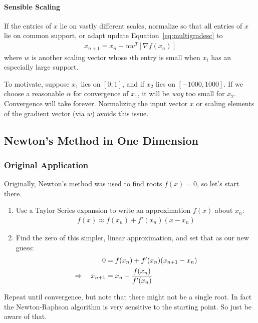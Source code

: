 \documentclass[a4paper,12pt]{scrartcl}
\theoremstyle{definition}
\theoremstyle{remark}
\begin{document}
\paragraph{Sensible Scaling}
If the entries of $x$ lie on vastly different scales, normalize so that
all entries of $x$ lie on common support, or adapt update
Equation~\ref{eq:multigradesc} to
\begin{align}
  x_{n+1} = x_n - \alpha w^T [\nabla f(x_n)]
\end{align}
where $w$ is another scaling vector whose $i$th entry is small when
$x_i$ has an especially large support.

To motivate, suppose $x_1$ lies on $[0,1]$, and if $x_2$ lies on
$[-1000, 1000]$. If we choose a reasonable $\alpha$ for convergence of
$x_1$, it will be \emph{way} too small for $x_2$. Convergence will take
forever. Normalizing the input vector $x$ or scaling elements of the
gradient vector (via $w$) avoids this issue.


\subsection{Newton's Method in One Dimension}

\subsubsection{Original Application}

Originally, Newton's method was used to find roots $f(x)=0$, so let's
start there.
\begin{enumerate}
  \item Use a Taylor Series expansion to write an approximation $f(x)$
    about $x_n$:
    \begin{align*}
      f(x) \approx f(x_n) + f'(x_n)(x-x_n)
    \end{align*}

  \item Find the zero of this simpler, linear approximation, and set
    that as our new guess:
    \begin{align}
      0 &= f(x_n) + f'(x_n)(x_{n+1}-x_n)\notag\\
      \Rightarrow \quad x_{n+1} &= x_n - \frac{f(x_n)}{f'(x_n)}
      \label{eq:newtonupdate1}
    \end{align}

\end{enumerate}
Repeat until convergence, but note that there might not be a single
root. In fact the Newton-Raphson algorithm is very sensitive to the
starting point. So just be aware of that.
\end{document}
